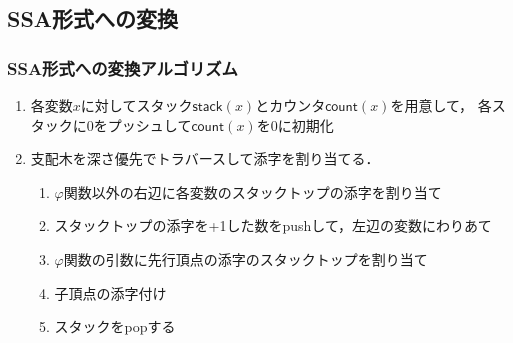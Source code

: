 \documentclass[dvipdfmx]{beamer}
\begin{document}
\subsection{SSA形式への変換}

\begin{frame}
\frametitle{SSA形式への変換アルゴリズム}
\begin{enumerate}
\item 各変数$x$に対してスタック$\mathsf{stack}(x)$とカウンタ$\mathsf{count}(x)$を用意して，
各スタックに$0$をプッシュして$\mathsf{count}(x)$を0に初期化

\item 支配木を深さ優先でトラバースして添字を割り当てる．
\begin{enumerate}
\item $\varphi$関数以外の右辺に各変数のスタックトップの添字を割り当て
\item スタックトップの添字を+1した数をpushして，左辺の変数にわりあて
\item $\varphi$関数の引数に先行頂点の添字のスタックトップを割り当て
\item 子頂点の添字付け
\item スタックをpopする
\end{enumerate}
\end{enumerate}

\end{frame}
\end{document}
